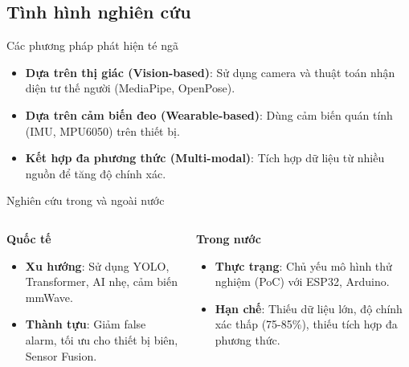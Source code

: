 
\subsection{Tình hình nghiên cứu}
\begin{frame}{Các phương pháp phát hiện té ngã}
    \begin{itemize}
        \item \textbf{Dựa trên thị giác (Vision-based)}: Sử dụng camera và thuật toán nhận diện tư thế người (MediaPipe, OpenPose).
        \item \textbf{Dựa trên cảm biến đeo (Wearable-based)}: Dùng cảm biến quán tính (IMU, MPU6050) trên thiết bị.
        \item \textbf{Kết hợp đa phương thức (Multi-modal)}: Tích hợp dữ liệu từ nhiều nguồn để tăng độ chính xác.
    \end{itemize}
\end{frame}


\begin{frame}{Nghiên cứu trong và ngoài nước}
    \begin{columns}[T]
        \begin{column}{0.48\textwidth}
            \textbf{Quốc tế}
            \begin{itemize}
                \item \textbf{Xu hướng}: Sử dụng YOLO, Transformer, AI nhẹ, cảm biến mmWave.
                \item \textbf{Thành tựu}: Giảm false alarm, tối ưu cho thiết bị biên, Sensor Fusion.
            \end{itemize}
        \end{column}
        \begin{column}{0.48\textwidth}
            \textbf{Trong nước}
            \begin{itemize}
                \item \textbf{Thực trạng}: Chủ yếu mô hình thử nghiệm (PoC) với ESP32, Arduino.
                \item \textbf{Hạn chế}: Thiếu dữ liệu lớn, độ chính xác thấp (75-85\%), thiếu tích hợp đa phương thức.
            \end{itemize}
        \end{column}
    \end{columns}
\end{frame}

